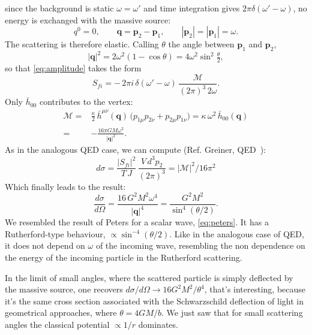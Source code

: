 \documentclass[12pt,a4paper,oneside]{article}
\numberwithin{equation}{section}   %
\begin{document}
since the background is static $\omega=\omega'$ and time integration
gives $2\pi\delta(\omega'-\omega)$, no energy
is exchanged with the massive source:
\begin{equation}
    \label{eq:elastic}
    q^{0}=0,\qquad
    \mathbf{q}=\mathbf{p}_2-\mathbf{p}_1,\qquad
    |\mathbf{p}_2|=|\mathbf{p}_1|=\omega .
\end{equation}
The scattering is therefore elastic. 
Calling $\theta$ the angle between
$\mathbf p_1$ and $\mathbf p_2$,
\begin{equation}
|\mathbf q|^2=2\omega^2(1-\cos\theta)=4\omega^2\sin^2\tfrac{\theta}{2},
\end{equation}
so that \eqref{eq:amplitude} takes the form
\begin{equation}
    S_{fi}=-\,2\pi i\,\delta(\omega'-\omega)\,
    \frac{\mathcal M}{(2\pi)^3\,2\omega}.
\end{equation}
Only $\bar h_{00}$ contributes to the vertex:
\begin{align}
    \label{eq:M-schw}
    \mathcal M=&\frac{\kappa}{2}\,\bar h^{\mu\nu}(\mathbf q)\,
    \bigl(p_{1\mu} p_{2\nu}+p_{2\mu} p_{1\nu}\bigr)\nonumber
    =\kappa\,\omega^2\,\bar h_{00}(\mathbf q)\\
=&-\frac{16\pi GM\omega^2}{|\mathbf q|^2}.
\end{align}
As in the analogous QED case, we can compute (Ref. Greiner, QED~\cite{GreinerQED}):
\begin{equation}
d\sigma=\frac{|S_{fi}|^2}{T\,J}\,\frac{V\,d^3p_2}{(2\pi)^3}=|\mathcal M|^2/16\pi^2
\end{equation} 
Which finally leads to the result:
\begin{equation}
    \label{eq:xsec-schw}
    \boxed{
    \frac{d\sigma}{d\Omega}
    = \frac{16\,G^2M^2\omega^4}{|\mathbf q|^4}
    =\frac{G^2M^2}{\sin^{4}(\theta/2)}.
    }
\end{equation}
We resembled the result of Peters for a scalar wave, \eqref{eq:peters}.
It has a Rutherford-type behaviour, $\propto\sin^{-4}(\theta/2)$. 
Like in the analogous
 case of QED, it does not depend on $\omega$ of the
incoming wave, resembling the non dependence on the 
energy of the incoming particle in the Rutherford scattering.

In the limit of small angles, where
the scattered particle is simply deflected by
the massive source, one recovers
$d\sigma/d\Omega\to 16G^{2}M^{2}/\theta^{4}$, that's interesting, 
because it's the same cross section associated
with the Schwarzschild deflection of light in geometrical 
approaches, where $\theta=4GM/b$. We just saw that for small
scattering angles the classical potential $\propto 1/r$ dominates.
\end{document}
